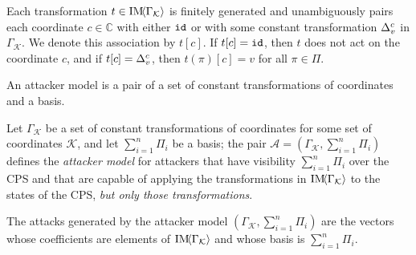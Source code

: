 {{\begin{definition}
Each transformation $t\in \text{IM}\!{{\left<\Gamma_{\mathcal{K}}\right>}}$ is finitely generated and unambiguously pairs each coordinate $c\in \mathbb{C}$ with either ${\texttt{id}}$ or with some constant transformation ${\Delta}^{c}_{v}$ in $\Gamma_{\mathcal{K}}$.  We denote this association by $t[c]$. If $t[c]={\texttt{id}}$, then $t$ does not act on the coordinate $c$, and if $t[c]={\Delta}^{c}_{v}$, then $t(\pi)[c]=v$ for all $\pi \in \Pi$.
\end{definition}
An attacker model is a pair of a set of constant transformations of coordinates and a basis.
\begin{definition}
  Let $\Gamma_\mathcal{K}$ be a set of constant transformations of coordinates for some set of coordinates $\mathcal{K}$, and let $\sum_{i=1}^n\Pi_i$ be a basis; the pair $\mathcal{A}=(\Gamma_{\mathcal{K}}, \sum_{i=1}^n\Pi_i)$ defines the \emph{attacker model} for attackers that have visibility $\sum_{i=1}^n\Pi_i$ over the CPS and that are capable of applying the transformations in $\text{IM}\!{{\left<\Gamma_\mathcal{K}\right>}}$ %
   to the states of the CPS, \emph{but only those transformations}. %
   
   The attacks generated by the attacker model $(\Gamma_{\mathcal{K}}, \sum_{i=1}^n\Pi_i)$ are the vectors whose coefficients are elements of $\text{IM}\!{{\left<\Gamma_\mathcal{K}\right>}}$ and whose basis is $\sum_{i=1}^n\Pi_i$. 
 \end{definition}
 
}}
